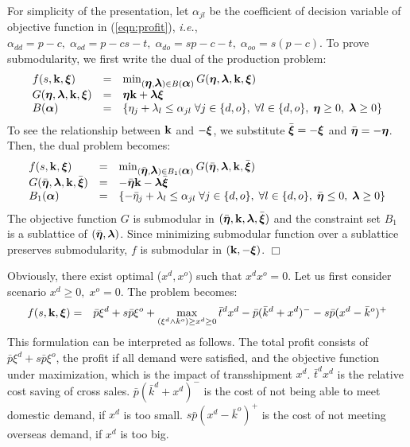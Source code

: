 \documentclass[mnsc,nonblindrev,copyedit]{informs2_wz} %
\newcommand{\qed}{ \hfill $\Box$ }
\newcommand{\xiv}{\mbox{\boldmath$\xi$}}
\newcommand{\etav}{\mbox{\boldmath$\eta$}}
\newcommand{\lambdav}{\mbox{\boldmath$\lambda$}}
\newcommand{\alphav}{\mbox{\boldmath$\alpha$}}
\begin{document}
\medskip

 For simplicity of the presentation, let $\alpha_{jl}$ be the coefficient of decision variable of objective function in (\ref{eqn:profit}), {\it i.e.}, $\alpha_{dd} = p-c, \; \alpha_{od} = p-cs-t,\; \alpha_{do} = sp -c -t, \; \alpha_{oo} = s(p-c)$.  To prove submodularity, we first write the dual of the production problem:
\begin{equation*}
\begin{array}{lll}
    f(s,\bold k, \xiv) &=& \min_{(\etav, \lambdav) \in B (\alphav)} G (\etav, \lambdav, \bold k ,\xiv)  \\
    G(\etav,\lambdav,\bold k, \xiv) &=& \etav \bold k + \lambdav \xiv \\
    B (\alphav) &=& \{\eta_j+\lambda_l  \leq \alpha_{jl} \; \forall j \in \{d,o\}, \; \forall l \in \{d,o\},\;  \etav \geq 0,\; \lambdav \geq 0 \}
\end{array}
\end{equation*}
To see the relationship between $\bold k$ and $-\xiv$, we substitute $\bar{\xiv} = - \xiv$ and $\bar{\etav} = - \etav$.  Then, the dual problem becomes:
\begin{equation*}
\begin{array}{lll}
    f(s,\bold k, \xiv) &=& \min_{(\bar{\etav}, \lambdav) \in B_1 (\alphav)} G (\bar{\etav}, \lambdav, \bold k ,\bar{\xiv})  \\
    G(\bar{\etav},\lambdav,\bold k, \bar{\xiv}) &=& -\bar{\etav} \bold k - \lambdav \bar{\xiv} \\
     B_1(\alphav) &=& \{-\bar{\eta}_j+\lambda_l  \leq \alpha_{jl} \; \forall j \in \{d,o\}, \; \forall l \in \{d,o\},\;  \bar{\etav} \leq 0,\; \lambdav \geq 0 \}
\end{array}
\end{equation*}
The objective function $G$ is submodular in $(\bar{\etav},\bold k,\lambdav, \bar{\xiv})$ and the constraint set $B_1$  is a sublattice of $(\bar{\etav},\lambdav)$.  Since minimizing submodular function over a sublattice preserves submodularity, $f$ is submodular in $(\bold{k}, -\xiv)$.  \qed

\medskip

Obviously, there exist optimal ($x^d,x^o$) such that $x^dx^o =0$.  Let us first consider scenario $x^d \geq 0, \;x^o =0$.  The problem becomes:
\begin{eqnarray*}
    f(s,\bold {k},\xiv) &=& \bar{p}\xi^d + s\bar{p}\xi^o +\max_{(\xi^d \wedge k^o) \geq x^d \geq 0} \bar{t}^d x^d - \bar{p}(\bar{k}^d + x^d)^- - s\bar{p}(x^d-\bar{k}^o)^+
\end{eqnarray*}
This formulation can be interpreted as follows.  The total profit consists of $\bar{p}\xi^d + s\bar{p}\xi^o$, the profit if all demand were satisfied, and the objective function under maximization, which is the impact of transshipment $x^d$.  $\bar{t}^d x^d$ is the relative cost saving of cross sales.  $\bar{p}(\bar{k}^d + x^d)^-$ is the cost of not being able to meet domestic demand, if $x^d$ is too small.  $s\bar{p}(x^d-\bar{k}^o)^+$ is the cost of not meeting overseas demand, if $x^d$ is too big.
\end{document}
